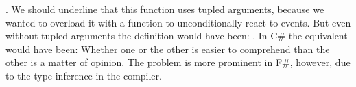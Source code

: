 \newline
{}.\newline
We should underline that this function uses tupled arguments, because we wanted to overload it with a function to unconditionally react to events. But even without tupled arguments the definition would have been:\newline
{}.\newline
In C\# the equivalent would have been:\newline
{}\newline
Whether one or the other is easier to comprehend than the other is a matter of opinion. The problem is more prominent in F\#, however, due to the type inference in the compiler.
